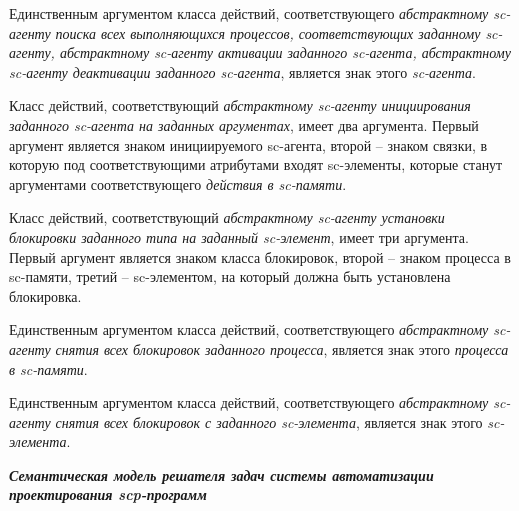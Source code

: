 Единственным аргументом класса действий, соответствующего \textit{абстрактному sc-агенту поиска всех выполняющихся процессов, соответствующих заданному sc-агенту, абстрактному sc-агенту активации заданного sc-агента, абстрактному sc-агенту деактивации заданного sc-агента}, является знак этого \textit{sc-агента}.

Класс действий, соответствующий \textit{абстрактному sc-агенту инициирования заданного sc-агента на заданных аргументах}, имеет два аргумента. Первый аргумент является знаком инициируемого sc-агента, второй -- знаком связки, в которую под соответствующими атрибутами входят sc-элементы, которые станут аргументами соответствующего \textit{действия в sc-памяти}.

Класс действий, соответствующий \textit{абстрактному sc-агенту установки блокировки заданного типа на заданный sc-элемент}, имеет три аргумента. Первый аргумент является знаком класса блокировок, второй -- знаком процесса в sc-памяти, третий -- sc-элементом, на который должна быть установлена блокировка.

Единственным аргументом класса действий, соответствующего \textit{абстрактному sc-агенту снятия всех блокировок заданного процесса}, является знак этого \textit{процесса в sc-памяти}.

Единственным аргументом класса действий, соответствующего \textit{абстрактному sc-агенту снятия всех блокировок с заданного sc-элемента}, является знак этого \textit{sc-элемента}.


\textit{\textbf{Семантическая модель решателя задач системы автоматизации проектирования scp-программ}}

